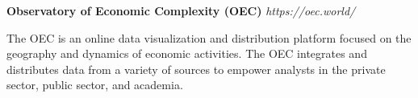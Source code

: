 \item
\headerrow
{\textbf{Observatory of Economic Complexity (OEC)}}
{\emph{https://oec.world/}}
\begin{itemize*}
    \item The OEC is an online data visualization and distribution platform 
    focused on the geography and dynamics of economic activities. 
    The OEC integrates and distributes data from a variety of sources to empower analysts 
    in the private sector, public sector, and academia.
\end{itemize*}